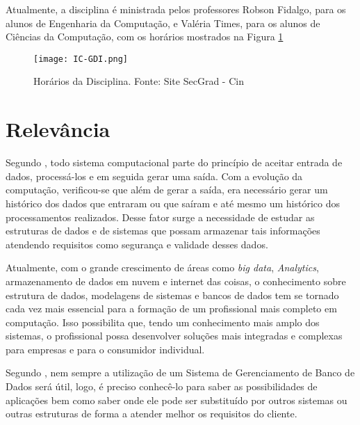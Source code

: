 \documentclass[10pt]{article}
\begin{document}
Atualmente, a disciplina é ministrada pelos professores Robson Fidalgo, para os alunos de Engenharia da Computação, e Valéria Times, para os alunos de Ciências da Computação, com os horários mostrados na Figura \ref{horarioGDI}

\begin{figure}[ht]
\centerline{\texttt{[image: IC-GDI.png]}}
\caption{Horários da Disciplina. Fonte: Site SecGrad - Cin \cite{SecGRad}}
\label{horarioGDI}
\end{figure}

\section{Relevância}
Segundo \cite{SQLcp}, todo sistema computacional parte do princípio de aceitar entrada de dados, processá-los e em seguida gerar uma saída. Com a evolução da computação, verificou-se que além de gerar a saída, era necessário gerar um histórico dos dados que entraram ou que saíram e até mesmo um histórico dos processamentos realizados. Desse fator surge a necessidade de estudar as estruturas de dados e de sistemas que possam armazenar tais informações atendendo requisitos como segurança e validade desses dados.

Atualmente, com o grande crescimento de áreas como \textit{big data}, \textit{Analytics}, armazenamento de dados em nuvem e internet das coisas, o conhecimento sobre estrutura de dados, modelagens de sistemas e bancos de dados tem se tornado cada vez mais essencial para a formação de um profissional mais completo em computação. Isso possibilita que, tendo um conhecimento mais amplo dos sistemas, o profissional possa desenvolver soluções mais integradas e complexas para empresas e para o consumidor individual.

Segundo \cite{SGBD}, nem sempre a utilização de um Sistema de Gerenciamento de Banco de Dados será útil, logo, é preciso conhecê-lo para saber as possibilidades de aplicações bem como saber onde ele pode ser substituído por outros sistemas ou outras estruturas de forma a atender melhor os requisitos do cliente.
\end{document}
